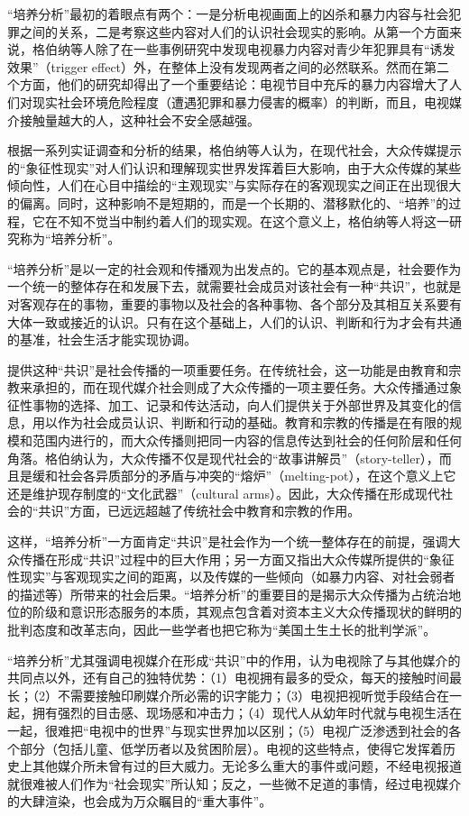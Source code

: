 \documentclass[UTF8,12pt]{ctexart}
\numberwithin{equation}{section} %
\numberwithin{figure}{section}
\numberwithin{table}{section}
\begin{document}
	“培养分析”最初的着眼点有两个：一是分析电视画面上的凶杀和暴力内容与社会犯罪之间的关系，二是考察这些内容对人们的认识社会现实的影响。从第一个方面来说，格伯纳等人除了在一些事例研究中发现电视暴力内容对青少年犯罪具有“诱发效果”（trigger effect）外，在整体上没有发现两者之间的必然联系。然而在第二个方面，他们的研究却得出了一个重要结论：电视节目中充斥的暴力内容增大了人们对现实社会环境危险程度（遭遇犯罪和暴力侵害的概率）的判断，而且，电视媒介接触量越大的人，这种社会不安全感越强。
	
	根据一系列实证调查和分析的结果，格伯纳等人认为，在现代社会，大众传媒提示的“象征性现实”对人们认识和理解现实世界发挥着巨大影响，由于大众传媒的某些倾向性，人们在心目中描绘的“主观现实”与实际存在的客观现实之间正在出现很大的偏离。同时，这种影响不是短期的，而是一个长期的、潜移默化的、“培养”的过程，它在不知不觉当中制约着人们的现实观。在这个意义上，格伯纳等人将这一研究称为“培养分析”。
	
	“培养分析”是以一定的社会观和传播观为出发点的。它的基本观点是，社会要作为一个统一的整体存在和发展下去，就需要社会成员对该社会有一种“共识”，也就是对客观存在的事物，重要的事物以及社会的各种事物、各个部分及其相互关系要有大体一致或接近的认识。只有在这个基础上，人们的认识、判断和行为才会有共通的基准，社会生活才能实现协调。
	
	提供这种“共识”是社会传播的一项重要任务。在传统社会，这一功能是由教育和宗教来承担的，而在现代媒介社会则成了大众传播的一项主要任务。大众传播通过象征性事物的选择、加工、记录和传达活动，向人们提供关于外部世界及其变化的信息，用以作为社会成员认识、判断和行动的基础。教育和宗教的传播是在有限的规模和范围内进行的，而大众传播则把同一内容的信息传达到社会的任何阶层和任何角落。格伯纳认为，大众传播不仅是现代社会的“故事讲解员”（story-teller），而且是缓和社会各异质部分的矛盾与冲突的“熔炉”（melting-pot），在这个意义上它还是维护现存制度的“文化武器”（cultural arms）。因此，大众传播在形成现代社会的“共识”方面，已远远超越了传统社会中教育和宗教的作用。
	
	这样，“培养分析”一方面肯定“共识”是社会作为一个统一整体存在的前提，强调大众传播在形成“共识”过程中的巨大作用；另一方面又指出大众传媒所提供的“象征性现实”与客观现实之间的距离，以及传媒的一些倾向（如暴力内容、对社会弱者的描述等）所带来的社会后果。“培养分析”的重要目的是揭示大众传播为占统治地位的阶级和意识形态服务的本质，其观点包含着对资本主义大众传播现状的鲜明的批判态度和改革志向，因此一些学者也把它称为“美国土生土长的批判学派”。
	
	“培养分析”尤其强调电视媒介在形成“共识”中的作用，认为电视除了与其他媒介的共同点以外，还有自己的独特优势：（1）电视拥有最多的受众，每天的接触时间最长；（2）不需要接触印刷媒介所必需的识字能力；（3）电视把视听觉手段结合在一起，拥有强烈的目击感、现场感和冲击力；（4）现代人从幼年时代就与电视生活在一起，很难把“电视中的世界”与现实世界加以区别；（5）电视广泛渗透到社会的各个部分（包括儿童、低学历者以及贫困阶层）。电视的这些特点，使得它发挥着历史上其他媒介所未曾有过的巨大威力。无论多么重大的事件或问题，不经电视报道就很难被人们作为“社会现实”所认知；反之，一些微不足道的事情，经过电视媒介的大肆渲染，也会成为万众瞩目的“重大事件”。
	
\end{document}
